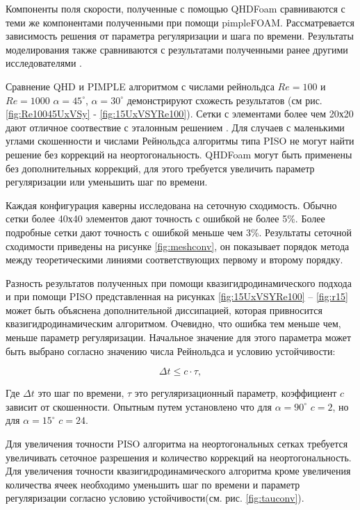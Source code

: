 Компоненты поля скорости, полученные с помощью QHDFoam сравниваются с теми же компонентами полученными при помощи pimpleFOAM. Рассматревается зависимость решения от параметра регуляризации и шага по времени. Результаты моделирования также сравниваются с результатами полученными ранее другими исследователями \cite{Hines2008,Erturk2007}. 

Сравнение QHD и PIMPLE алгоритмом с числами рейнольдса $Re=100$ и $Re=1000$ $\alpha = 45^{\circ}$, $\alpha = 30^{\circ}$ демонстрируют схожесть результатов (см рис. \ref{fig:Re10045UxVSy} - \ref{fig:15UxVSYRe100}). Сетки с элементами более чем 20х20 дают отличное соотвествие с эталонным решением \cite{Erturk2007}. Для случаев с маленькими углами скошенности и числами Рейнольдса алгоритмы типа PISO не могут найти решение без коррекций на неортогональность. QHDFoam могут быть применены без дополнительных коррекций, для этого требуется увеличить параметр регуляризации или уменьшить шаг по времени.

Каждая конфигурация каверны исследована на сеточную сходимость. Обычно сетки более 40х40 элементов дают точность с ошибкой не более 5\%. Более подробные сетки дают точность с ошибкой меньше чем 3\%. Результаты сеточной сходимости приведены на рисунке \ref{fig:meshconv}, он показывает порядок метода между теоретическими линиями соответствующих первому и второму порядку.

Разность результатов полученных при помощи квазигидродинамического подхода и при помощи PISO представленная на рисунках \ref{fig:15UxVSYRe100} -- \ref{fig:r15} может быть объяснена дополнительной диссипацией, которая привносится квазигидродинамическим алгоритмом. Очевидно, что ошибка тем меньше чем, меньше параметр регуляризации. Начальное значение для этого параметра может быть выбрано согласно значению числа Рейнольдса и условию устойчивости:

\begin{equation}
    \Delta t \leq c \cdot \tau,
\end{equation}

Где $\Delta t$ это шаг по времени, $\tau$ это регуляризационный параметр, коэффициент $c$ зависит от скошенности. Опытным путем установлено что для $\alpha = 90^{\circ}$ $c=2$, но для $\alpha = 15^{\circ}$ $c=24$.

Для увеличения точности PISO алгоритма на неортогональных сетках требуется увеличивать сеточное разрешения и количество коррекций на неортогональность. Для увеличения точности квазигидродинамического алгоритма кроме увеличения количества ячеек необходимо уменьшить шаг по времени и параметр регуляризации согласно условию устойчивости(см. рис. \ref{fig:tauconv}). 


